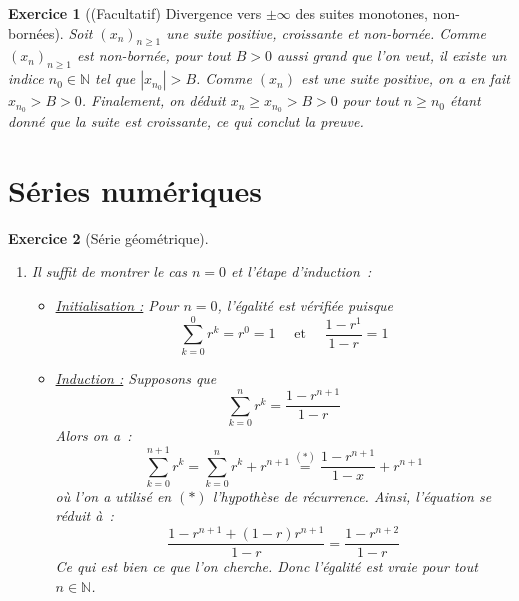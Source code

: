 \documentclass[11.5pt,french,table]{article}
\newcommand{\enumeratelinefix}{\leavevmode \vspace{-\baselineskip}} %
\theoremstyle{exercice}
\newtheorem{exercice}{Exercice}
\begin{document}
\begin{exercice}[(Facultatif) Divergence vers $\pm \infty$ des suites monotones, non-bornées]
Soit $(x_n)_{n \geq 1}$ une suite positive, croissante et non-bornée.
Comme $(x_n)_{n \geq 1}$ est non-bornée, pour tout $B > 0$ aussi grand que l'on veut, il existe un indice $n_0 \in \mathbb N$ tel que $|x_{n_0}| > B$.
Comme $(x_n)$ est une suite positive, on a en fait $x_{n_0} > B > 0$.
Finalement, on déduit $x_{n} \geq x_{n_0} > B > 0$ pour tout $n \geq n_0$ étant donné que la suite est croissante, ce qui conclut la preuve.
\end{exercice}

\part{Séries numériques}
\begin{exercice}[Série géométrique]
\enumeratelinefix
\begin{enumerate}
    \item Il suffit de montrer le cas $n = 0$ et l'étape d'induction~:
    \begin{itemize}
        \item \underline{Initialisation :} Pour $n = 0$, l'égalité est vérifiée puisque
        \[
        \sum_{k = 0}^{0} r^k = r^0 = 1 \quad \textrm{ et } \quad \frac{1 - r^1}{1 - r} = 1
        \]
        \item \underline{Induction :} Supposons que 
        \[
        \sum_{k = 0}^{n} r^k = \frac{1 - r^{n+1}}{1 - r}
        \]
        Alors on a~:
        \[
        \sum_{k = 0}^{n+1} r^k = \sum_{k = 0}^{n} r^k + r^{n+1} \stackrel{(*)}{=} \frac{1 - r^{n+1}}{1-x} + r^{n+1}
        \]
        où l'on a utilisé en $(*)$ l'hypothèse de récurrence. Ainsi, l'équation se réduit à~:
        \[
        \frac{1-r^{n+1} + (1-r)r^{n+1}}{1-r} = \frac{1 - r^{n+2}}{1-r}
        \]
        Ce qui est bien ce que l'on cherche. Donc l'égalité est vraie pour tout $n \in \mathbb{N}$.
    \end{itemize}
    

\end{enumerate}
\end{exercice}
\end{document}
